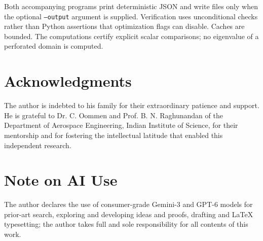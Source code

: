 \documentclass[11pt,reqno]{amsart}
\numberwithin{equation}{section}
\begin{document}
Both accompanying programs print deterministic JSON and write
files only when the optional \texttt{--output} argument is
supplied. Verification uses unconditional checks rather than
Python assertions that optimization flags can disable.
Caches are bounded. The computations certify explicit scalar
comparisons; no eigenvalue of a perforated domain is computed.

\section*{Acknowledgments}
The author is indebted to his family for their extraordinary patience and support. He is grateful to Dr. C. Oommen and Prof. B. N. Raghunandan of the Department of Aerospace Engineering, Indian Institute of Science, for their mentorship and for fostering the intellectual latitude that enabled this independent research.

\section*{Note on AI Use}
The author declares the use of consumer-grade Gemini-3 and GPT-6 models for prior-art search, exploring and developing ideas and proofs, drafting and LaTeX typesetting; the author takes full and sole responsibility for all contents of this work.
\end{document}
